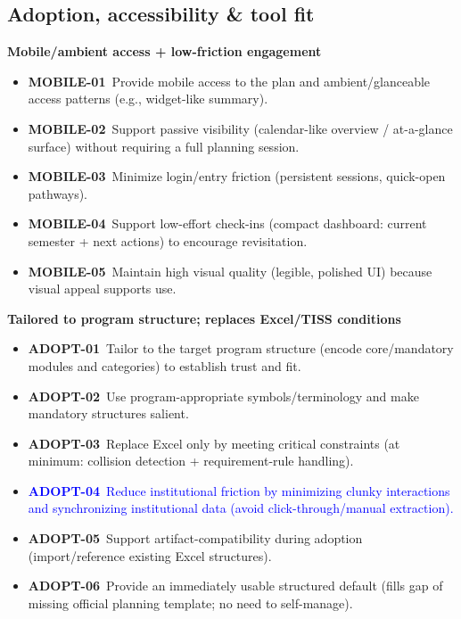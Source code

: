 \subsection*{Adoption, accessibility \& tool fit}

\textbf{Mobile/ambient access + low-friction engagement}
\begin{itemize}
  \item \textbf{MOBILE-01}~Provide mobile access to the plan and ambient/glanceable access patterns (e.g., widget-like summary).
  \item \textbf{MOBILE-02}~Support passive visibility (calendar-like overview / at-a-glance surface) without requiring a full planning session.
  \item \textbf{MOBILE-03}~Minimize login/entry friction (persistent sessions, quick-open pathways).
  \item \textbf{MOBILE-04}~Support low-effort check-ins (compact dashboard: current semester + next actions) to encourage revisitation.
  \item \textbf{MOBILE-05}~Maintain high visual quality (legible, polished UI) because visual appeal supports use.
\end{itemize}

\textbf{Tailored to program structure; replaces Excel/TISS conditions}
\begin{itemize}
  \item \textbf{ADOPT-01}~Tailor to the target program structure (encode core/mandatory modules and categories) to establish trust and fit.
  \item \textbf{ADOPT-02}~Use program-appropriate symbols/terminology and make mandatory structures salient.
  \item \textbf{ADOPT-03}~Replace Excel only by meeting critical constraints (at minimum: collision detection + requirement-rule handling).
  \item \textcolor{blue}{\textbf{ADOPT-04}~Reduce institutional friction by minimizing clunky interactions and synchronizing institutional data (avoid click-through/manual extraction).}
  \item \textbf{ADOPT-05}~Support artifact-compatibility during adoption (import/reference existing Excel structures).
  \item \textbf{ADOPT-06}~Provide an immediately usable structured default (fills gap of missing official planning template; no need to self-manage).
\end{itemize}   